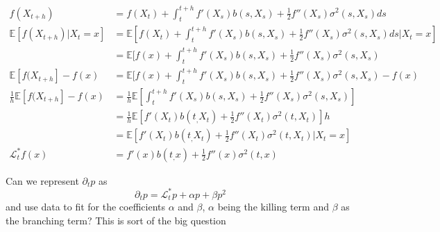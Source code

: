 \documentclass{article}
\begin{document}
\begin{align*}
    f(X_{t+h}) &=f(X_t) + \int_t^{t+h}f'(X_s)b(s, X_s) + \frac{1}{2}f''(X_s)\sigma^2(s, X_s)ds\\
    \mathbb{E}[f(X_{t+h}) | X_t= x] &= \mathbb{E}[f(X_t) + \int_t^{t+h}f'(X_s)b(s, X_s) + \frac{1}{2}f''(X_s)\sigma^2(s, X_s)ds | X_t = x]\\
    &= \mathbb{E}[f(x) + \int_t^{t+h}f'(X_s)b(s, X_s) + \frac{1}{2}f''(X_s)\sigma^2(s, X_s)\\
    \mathbb{E}[f(X_{t+h}] - f(x) &= \mathbb{E}[f(x) + \int_t^{t+h}f'(X_s)b(s, X_s) + \frac{1}{2}f''(X_s)\sigma^2(s, X_s) - f(x)\\
    \frac{1}{h}\mathbb{E}[f(X_{t+h}] -f(x)&=\frac{1}{h} \mathbb{E}[\int_t^{t+h}f'(X_s)b(s, X_s) + \frac{1}{2}f''(X_s)\sigma^2(s, X_s)]\\
    &= \frac{1}{h} \mathbb{E}[f'(X_t)b(t_, X_t) + \frac{1}{2}f''(X_t)\sigma^2(t, X_t)]h\\
    &= \mathbb{E}[f'(X_t)b(t_, X_t) + \frac{1}{2}f''(X_t)\sigma^2(t, X_t) | X_t = x]\\
    \mathcal{L}_t^*f(x) &=f'(x)b(t_, x) + \frac{1}{2}f''(x)\sigma^2(t, x)
\end{align*}

Can we represent $\partial_tp $ as
\begin{equation}
    \partial_tp = \mathcal{L}_t^*p + \alpha p + \beta p^2
\end{equation}
and use data to fit for the coefficients $\alpha$ and $\beta$, $\alpha$ being the killing term and $\beta$ as the branching term? This is sort of the big question
\end{document}
